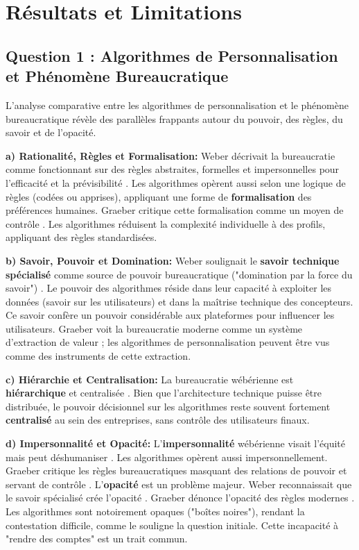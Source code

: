 \documentclass[11pt,a4paper]{article}
\begin{document}
\section{Résultats et Limitations}

\subsection{Question 1 : Algorithmes de Personnalisation et Phénomène Bureaucratique}
L'analyse comparative entre les algorithmes de personnalisation et le phénomène bureaucratique \cite{SerpaFerreira2019, Graeber2015} révèle des parallèles frappants autour du pouvoir, des règles, du savoir et de l'opacité.

\textbf{a) Rationalité, Règles et Formalisation:}
Weber décrivait la bureaucratie comme fonctionnant sur des règles abstraites, formelles et impersonnelles pour l'efficacité et la prévisibilité \cite{SerpaFerreira2019}. Les algorithmes opèrent aussi selon une logique de règles (codées ou apprises), appliquant une forme de \textbf{formalisation} des préférences humaines. Graeber critique cette formalisation comme un moyen de contrôle \cite{Graeber2015}. Les algorithmes réduisent la complexité individuelle à des profils, appliquant des règles standardisées.

\textbf{b) Savoir, Pouvoir et Domination:}
Weber soulignait le \textbf{savoir technique spécialisé} comme source de pouvoir bureaucratique ("domination par la force du savoir") \cite{SerpaFerreira2019}. Le pouvoir des algorithmes réside dans leur capacité à exploiter les données (savoir sur les utilisateurs) et dans la maîtrise technique des concepteurs. Ce savoir confère un pouvoir considérable aux plateformes pour influencer les utilisateurs. Graeber voit la bureaucratie moderne comme un système d'extraction de valeur \cite{Graeber2015}; les algorithmes de personnalisation peuvent être vus comme des instruments de cette extraction.

\textbf{c) Hiérarchie et Centralisation:}
La bureaucratie wébérienne est \textbf{hiérarchique} et centralisée \cite{SerpaFerreira2019}. Bien que l'architecture technique puisse être distribuée, le pouvoir décisionnel sur les algorithmes reste souvent fortement \textbf{centralisé} au sein des entreprises, sans contrôle des utilisateurs finaux.

\textbf{d) Impersonnalité et Opacité:}
L'\textbf{impersonnalité} wébérienne visait l'équité mais peut déshumaniser \cite{SerpaFerreira2019}. Les algorithmes opèrent aussi impersonnellement. Graeber critique les règles bureaucratiques masquant des relations de pouvoir et servant de contrôle \cite{Graeber2015}. L'\textbf{opacité} est un problème majeur. Weber reconnaissait que le savoir spécialisé crée l'opacité \cite{SerpaFerreira2019}. Graeber dénonce l'opacité des règles modernes \cite{Graeber2015}. Les algorithmes sont notoirement opaques ("boîtes noires"), rendant la contestation difficile, comme le souligne la question initiale. Cette incapacité à "rendre des comptes" est un trait commun.
\end{document}
